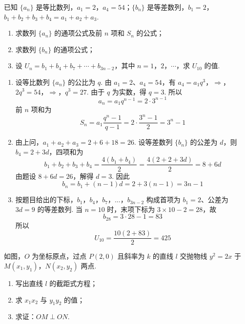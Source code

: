 \begin{problem}
已知 \(\{a_n\}\) 是等比数列，\(a_1=2\)，\(a_4=54\)；\(\{b_n\}\) 是等差数列，\(b_1=2\)，\(b_1+b_2+b_3+b_4=a_1+a_2+a_3\).

\begin{enumerate}
\item 求数列 \(\{a_n\}\) 的通项公式及前 \(n\) 项和 \(S_n\) 的公式；
\item 求数列 \(\{b_n\}\) 的通项公式；
\item 设 \(U_n=b_1+b_4+b_7+\cdots+b_{3n-2}\)，其中 \(n=1\)，\(2\)，\(\cdots\)，求 \(U_{10}\) 的值.
\end{enumerate}
\end{problem}

\begin{solution}
\begin{enumerate}
\item 设等比数列 \(\{a_n\}\) 的公比为 \(q\). 由 \(a_1=2\)、\(a_4=54\)，有
\(a_4=a_1q^3\)，\(\Longrightarrow\)，\(2q^3=54\)，\(\Longrightarrow\)，\(q^3=27\).
由于 \(q\) 为实数，得 \(q=3\). 所以
\[
a_n=a_1q^{n-1}=2\cdot3^{n-1}
\]
前 \(n\) 项和为
\[
S_n=a_1\frac{q^n-1}{q-1}=2\cdot\frac{3^n-1}{2}=3^n-1
\]
\item 由上问，\(a_1+a_2+a_3=2+6+18=26\). 设等差数列 \(\{b_n\}\) 的公差为 \(d\)，则 \(b_4=2+3d\)，四项和为
\[
b_1+b_2+b_3+b_4=\frac{4(b_1+b_4)}2=\frac{4(2+2+3d)}2=8+6d
\]
由题设 \(8+6d=26\)，解得 \(d=3\). 因此
\[
b_n=b_1+(n-1)d=2+3(n-1)=3n-1
\]
\item 按题目给出的下标，\(b_1\)，\(b_4\)，\(b_7\)，\(\ldots\)，\(b_{3n-2}\) 构成首项为 \(b_1=2\)、公差为 \(3d=9\) 的等差数列. 当 \(n=10\) 时，末项下标为 \(3\times10-2=28\)，故
\[
b_{28}=3\cdot28-1=83
\]
所以
\[
U_{10}=\frac{10(2+83)}{2}=425
\]
\end{enumerate}
\end{solution}

\begin{problem}
如图，\(O\) 为坐标原点，过点 \(P(2,0)\) 且斜率为 \(k\) 的直线 \(l\) 交抛物线 \(y^2=2x\) 于 \(M(x_1,y_1)\)，\(N(x_2,y_2)\) 两点.

\begin{enumerate}
\item 写出直线 \(l\) 的截距式方程；
\item 求 \(x_1x_2\) 与 \(y_1y_2\) 的值；
\item 求证：\(OM\perp ON\).
\end{enumerate}

\end{problem}

